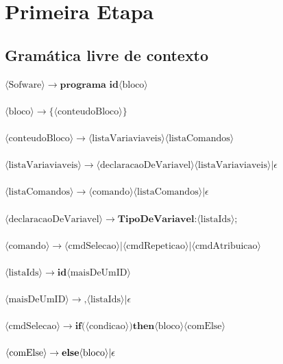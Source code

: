 \documentclass[11pt]{article}
\begin{document}
\section*{Primeira Etapa}

\subsection*{Gramática livre de contexto}


$\langle \text{Sofware} \rangle \rightarrow \textbf{programa } \textbf{id} \langle\text{bloco}\rangle$\\\\
$\langle\text{bloco}\rangle \rightarrow \textbf{\{} \langle\text{conteudoBloco}\rangle \textbf{\}}$\\\\
$\langle\text{conteudoBloco}\rangle \rightarrow \langle\text{listaVariaviaveis}\rangle \langle\text{listaComandos}\rangle$\\\\
$\langle\text{listaVariaviaveis}\rangle \rightarrow \langle\text{declaracaoDeVariavel}\rangle \langle\text{listaVariaviaveis}\rangle | \epsilon $\\\\
$\langle\text{listaComandos}\rangle \rightarrow \langle\text{comando}\rangle \langle\text{listaComandos}\rangle | \epsilon $\\\\
$\langle\text{declaracaoDeVariavel}\rangle  \rightarrow \textbf{TipoDeVariavel} \textbf{:} \langle\text{listaIds}\rangle \textbf{;}$\\\\
$\langle\text{comando}\rangle \rightarrow \langle\text{cmdSelecao}\rangle|\langle\text{cmdRepeticao}\rangle|\langle\text{cmdAtribuicao}\rangle$\\\\
$\langle\text{listaIds}\rangle \rightarrow \textbf{id} \langle\text{maisDeUmID} \rangle$\\\\
$\langle\text{maisDeUmID}\rangle \rightarrow \textbf{,}\langle\text{listaIds}\rangle  | \epsilon$\\\\
$\langle\text{cmdSelecao}\rangle \rightarrow \textbf{if(} \langle\text{condicao}\rangle \textbf{)then} \langle\text{bloco}\rangle \langle \text{comElse} \rangle$\\\\
$\langle \text{comElse} \rangle \rightarrow  \textbf{else} \langle\text{bloco}\rangle | \epsilon \\\\$
\end{document}
